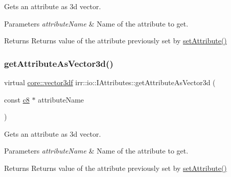 Gets an attribute as 3d vector. 


\begin{DoxyParams}{Parameters}
{\em attribute\+Name} & Name of the attribute to get. \\
\hline
\end{DoxyParams}
\begin{DoxyReturn}{Returns}
Returns value of the attribute previously set by \hyperlink{classirr_1_1io_1_1IAttributes_a03fa31acb481ae23678676cc183f09a6}{set\+Attribute()} 
\end{DoxyReturn}
\mbox{\label{classirr_1_1io_1_1IAttributes_ac4ad5d4db7fd08e0523d3f8e671c2f68}} 
\subsubsection{\texorpdfstring{get\+Attribute\+As\+Vector3d()}{getAttributeAsVector3d()}\hspace{0.1cm}{\footnotesize\ttfamily [2/4]}}
{\footnotesize\ttfamily virtual \hyperlink{namespaceirr_1_1core_ae6e2b2a6c552833ebbd5b7463d03586b}{core\+::vector3df} irr\+::io\+::\+I\+Attributes\+::get\+Attribute\+As\+Vector3d (\begin{DoxyParamCaption}\item[{const \hyperlink{namespaceirr_a9395eaea339bcb546b319e9c96bf7410}{c8} $\ast$}]{attribute\+Name }\end{DoxyParamCaption})\hspace{0.3cm}{\ttfamily [pure virtual]}}



Gets an attribute as 3d vector. 


\begin{DoxyParams}{Parameters}
{\em attribute\+Name} & Name of the attribute to get. \\
\hline
\end{DoxyParams}
\begin{DoxyReturn}{Returns}
Returns value of the attribute previously set by \hyperlink{classirr_1_1io_1_1IAttributes_a03fa31acb481ae23678676cc183f09a6}{set\+Attribute()} 
\end{DoxyReturn}
\mbox{\label{classirr_1_1io_1_1IAttributes_a7ff94072381cac9912d73c9c6c77c6ce}} 
